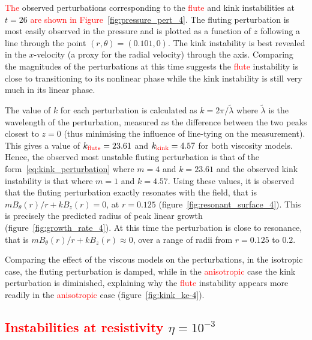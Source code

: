 \documentclass[12pt]{article}
\newcommand{\rs}[2]{\textcolor{red}{#2}}
\begin{document}
\rs{Figure~\ref{fig:pressure_pert_4} plots the }{The} observed
  perturbations corresponding to the \rs{fluting}{flute} and kink
  instabilities at $t=26$ \rs{}{are shown in
  Figure~\ref{fig:pressure_pert_4}}. The fluting perturbation is
  most easily observed in the pressure and is plotted as a function of $z$
  following a line through the point $(r, \theta) = (0.101, 0)$. The
  kink instability is best revealed in the $x$-velocity (a proxy for the
  radial velocity) through the axis. Comparing the magnitudes of the
  perturbations at this time suggests the \rs{fluting}{flute}
  instability is close to transitioning to its nonlinear phase while
  the kink instability is still very much in its linear
  phase.

The value of $k$ for each perturbation is calculated as $k = 2\pi/\tilde{\lambda}$ where $\tilde{\lambda}$ is the wavelength of the perturbation, measured as the difference between the two peaks closest to $z=0$ (thus minimising the influence of line-tying on the measurement). This gives a value of $k_{\rs{flute}{\text{flute}}}=23.61$ and $k_{\rs{kink}{\text{kink}}}=4.57$ for both viscosity models. Hence, the observed most unstable fluting perturbation is that of the form~\eqref{eq:kink_perturbation} where $m=4$ and $k=23.61$ and the observed kink instability is that where $m=1$ and $k=4.57$. Using these values, it is observed that the fluting perturbation exactly resonates with the field, that is $m B_{\theta}(r)/r + kB_z(r) = 0$, at $r=0.125$ (figure~\ref{fig:resonant_surface_4}). This is precisely the predicted radius of peak linear growth (figure~\ref{fig:growth_rate_4}). At this time the perturbation is close to resonance, that is $m B_{\theta}(r)/r + kB_z(r) \approx 0$, over a range of radii from $r=0.125$ to $0.2$.

Comparing the effect of the viscous models on the perturbations, in the isotropic case, the fluting perturbation is damped, while in the \rs{switching}{anisotropic} case the kink perturbation is diminished, explaining why the \rs{fluting}{flute} instability appears more readily in the \rs{switching}{anisotropic} case (figure~\ref{fig:kink_ke-4}).

\subsection{\rs{Development where}{Instabilities at resistivity} $\eta=10^{-3}$}
\end{document}
